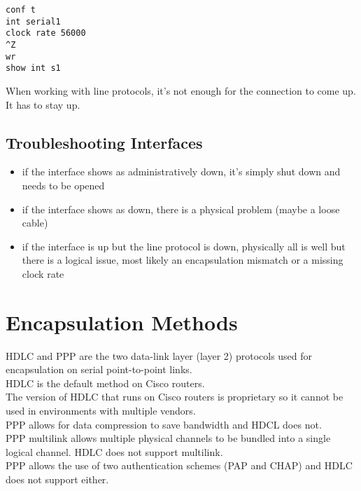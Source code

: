 \documentclass{article}
\begin{document}
\begin{verbatim}
conf t
int serial1
clock rate 56000
^Z
wr
show int s1
\end{verbatim}

When working with line protocols, it's not enough for the connection to
come up. It has to stay up.\\

\subsection{Troubleshooting Interfaces}

\begin{itemize}

\item if the interface shows as administratively down, it's simply shut
down and needs to be opened

\item if the interface shows as down, there is a physical problem (maybe
a loose cable)

\item if the interface is up but the line protocol is down, physically
all is well but there is a logical issue, most likely an encapsulation
mismatch or a missing clock rate

\end{itemize}

\section{Encapsulation Methods}

HDLC and PPP are the two data-link layer (layer 2) protocols used for
encapsulation on serial point-to-point links.\\

HDLC is the default method on Cisco routers.\\

The version of HDLC that runs on Cisco routers is proprietary so it cannot
be used in environments with multiple vendors.\\

PPP allows for data compression to save bandwidth and HDCL does not.\\

PPP multilink allows multiple physical channels to be bundled into a single
logical channel. HDLC does not support multilink.\\

PPP allows the use of two authentication schemes (PAP and CHAP) and HDLC
does not support either.\\
\end{document}
